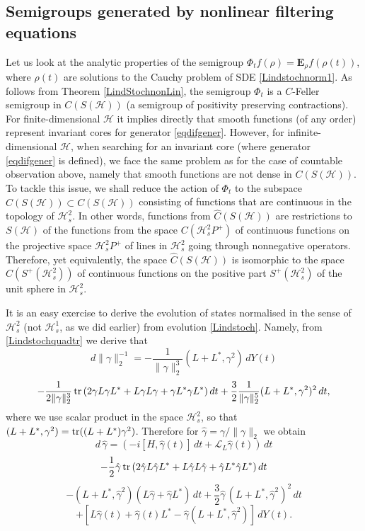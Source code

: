 \documentclass[12pt]{article}
\def\LC{\mathcal{L}}
\def\HC{\mathcal{H}}
\def\E{\mathbf{E}}
\def\tr{\rm{tr}}
\def\ga{\gamma}
\begin{document}
\subsection{Semigroups generated by nonlinear filtering equations}

Let us look at the analytic properties of the semigroup $\Phi_tf(\rho)=\E_{\rho} f(\rho(t))$,
where $\rho(t)$ are solutions to the Cauchy problem of SDE \eqref{Lindstochnorm1}. As follows
from Theorem \ref{LindStochnonLin}, the semigroup $\Phi_t$ is a $C$-Feller semigroup in $C(S(\HC))$
(a semigroup of positivity preserving contractions). For finite-dimensional $\HC$ it implies directly
that smooth functions (of any order) represent invariant cores for generator \eqref{eqdifgener}.
However, for infinite-dimensional $\HC$, when searching for an invariant core
(where generator \eqref{eqdifgener} is defined), we face the same problem
as for the case of countable observation above, namely that smooth functions
 are not dense in $C(S(\HC))$. To tackle this issue, we shall reduce the action
 of $\Phi_t$ to the subspace $\hat C(S(\HC))\subset C(S(\HC))$ consisting of functions that
 are continuous in the topology of $\HC^2_s$. In other words, functions from $\hat C(S(\HC))$
 are restrictions to $S(\HC)$ of the functions from the space $C(\HC^2_sP^+)$ of continuous functions
 on the projective space $\HC^2_sP^+$ of lines in $\HC^2_s$ going through nonnegative operators. Therefore, yet equivalently,
 the space $\hat C(S(\HC))$ is isomorphic to the space $C(S^+(\HC^2_s))$ of continuous functions on
 the positive part $S^+(\HC^2_s)$ of the unit sphere in $\HC^2_s$.

It is an easy exercise to derive the evolution of states normalised in the sense of $\HC^2_s$
(not $\HC^1_s$, as we did earlier) from evolution \eqref{Lindstoch}. Namely,
from \eqref{Lindstochquadtr} we derive that
\[
d\|\ga\|_2^{-1}=-\frac{1}{\|\ga\|_2^3}(L+L^*,\ga^2)\, dY(t)
\]
\[
-\frac{1}{2\|\ga\|_2^3} \,{\tr}\, (2\ga L\ga L^*+L \ga L \ga + \ga L^* \ga L^*) \, dt
 +\frac32 \frac{1}{\|\ga\|_2^5} (L+L^*,\ga^2)^2\, dt,
 \]
 where we use scalar product in the space $\HC^2_s$, so that $(L+L^*,\ga^2)={\tr}((L+L^*)\ga^2)$.
Therefore for $\hat \ga=\ga/\|\ga\|_2$ we obtain
\[
d \, \hat  \ga=(-i[H,\hat \ga(t)] \, dt +\LC_L \hat \ga(t)) \, dt
\]
\[
-\frac12 \hat \ga \, {\tr} \,(2\hat \ga L\hat \ga L^*+ L \hat \ga L \hat \ga + \hat \ga L^* \hat \ga L^*) \, dt
\]
\[
-(L+L^*, \hat \ga^2) (L\hat \ga +\hat \ga L^*) \, dt+\frac32 \hat \ga \, (L+L^*, \hat \ga^2) ^2 \, dt
\]
\[
+[L\hat \ga(t)+\hat \ga(t) L^* -\hat \ga (L+L^*, \hat \ga^2)]\, dY(t).
\]
\end{document}
